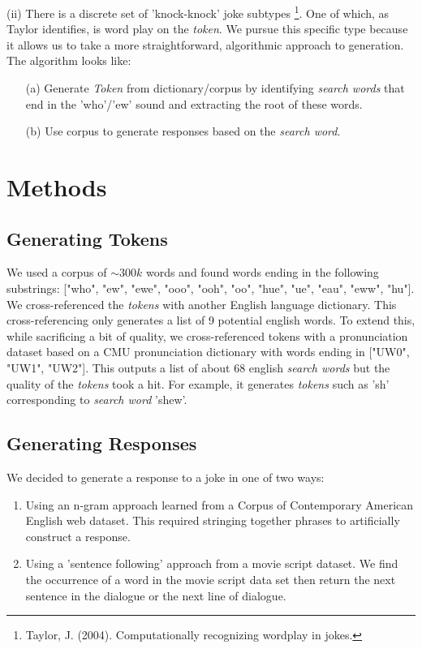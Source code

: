 \documentclass[twoside,twocolumn]{article}
\begin{document}
\noindent (ii) There is a discrete set of 'knock-knock' joke subtypes \footnote{Taylor, J. (2004). Computationally recognizing wordplay in jokes.}.
One of which, as Taylor identifies, is word play on the \emph{token}. We pursue this specific type because it allows us to take a more straightforward, algorithmic approach to generation.
The algorithm looks like:
\begin{center}
    \begin{enumerate}
    \item[(a)] Generate \emph{Token} from dictionary/corpus by identifying \emph{search words} that end in the 'who'/'ew' sound and extracting the root of these words.
    \item[(b)] Use corpus to generate responses based on the \emph{search word}.
    \end{enumerate}
\end{center}



\section{Methods}

\subsection{Generating Tokens}

We used a corpus of $\sim 300k$ words and found words ending in the following substrings: ["who", "ew", "ewe", "ooo", "ooh", "oo", "hue", "ue", "eau", "eww", "hu"].  We cross-referenced the \emph{tokens} with another English language dictionary. This cross-referencing only generates a list of 9 potential english words. To extend this, while sacrificing a bit of quality, we cross-referenced tokens with a pronunciation dataset based on a CMU pronunciation dictionary with words ending in ["UW0", "UW1", "UW2"]. This outputs a list of about 68 english \emph{search words} but the quality of the \emph{tokens} took a hit. For example, it generates \emph{tokens} such as 'sh' corresponding to \emph{search word} 'shew'. 

\subsection{Generating Responses}
We decided to generate a response to a joke in one of two ways:
\begin{enumerate}[label=(\roman*)]
\item Using an n-gram approach learned from a Corpus of Contemporary American English web dataset. This required stringing together phrases to artificially construct a response.
\item Using a 'sentence following' approach from a movie script dataset. We find the occurrence of a word in the movie script data set then return the next sentence in the dialogue or the next line of dialogue.
\end{enumerate}
\end{document}
